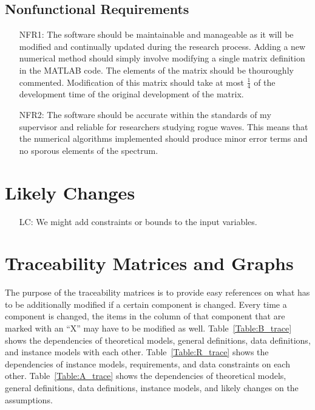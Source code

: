 \documentclass[12pt]{article}
\newcounter{lcnum} %
\begin{document}
\subsection{Nonfunctional Requirements}
\noindent \begin{itemize}
\item[NFR1:] The software should be maintainable and manageable as it will 
be modified and continually updated during the research process. Adding a new 
numerical method should simply involve modifying a single matrix definition in 
the MATLAB code.  The elements of the matrix should be thouroughly commented. 
Modification of this matrix should take at most $\frac{1}{4}$ of the 
development time of the original development of the matrix. 
\item[NFR2:] The software should be accurate within the standards of my 
supervisor and reliable for researchers studying rogue waves. This means that 
the numerical algorithms implemented should produce minor error terms and no 
sporous elements of the spectrum. 
\end{itemize}


\section{Likely Changes}    

\noindent \begin{itemize}

\item[LC\refstepcounter{lcnum}\thelcnum\label{LC_meaningfulLabel}:] We might 
add constraints or bounds to the input variables. 

\end{itemize}

\section{Traceability Matrices and Graphs}

The purpose of the traceability matrices is to provide easy references on what
has to be additionally modified if a certain component is changed.  Every time a
component is changed, the items in the column of that component that are marked
with an ``X'' may have to be modified as well.  Table~\ref{Table:B_trace} shows 
the
dependencies of theoretical models, general definitions, data definitions, and
instance models with each other. Table~\ref{Table:R_trace} shows the
dependencies of instance models, requirements, and data constraints on each
other. Table~\ref{Table:A_trace} shows the dependencies of theoretical models,
general definitions, data definitions, instance models, and likely changes on
the assumptions.\\
\end{document}
